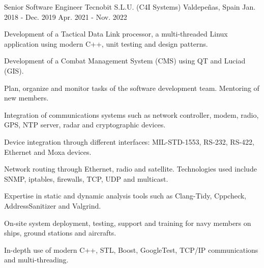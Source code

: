 

\begin{cventries}

  \cventry
    {Senior Software Engineer} %
    {Tecnobit S.L.U. (C4I Systems)} %
    {Valdepeñas, Spain} %
    {Jan. 2018 - Dec. 2019  \newline   Apr. 2021 - Nov. 2022} %
    {
      \begin{cvitems} %
        \item {Development of a Tactical Data Link processor, a multi-threaded Linux application using modern C++, unit testing and design patterns.}
        \item {Development of a Combat Management System (CMS) using QT and Luciad (GIS).}
        \item {Plan, organize and monitor tasks of the software development team. Mentoring of new members.}
        \item {Integration of communications systems such as network controller, modem, radio, GPS, NTP server, radar and cryptographic devices.}
        \item {Device integration through different interfaces: MIL-STD-1553, RS-232, RS-422, Ethernet and Moxa devices.}
        \item {Network routing through Ethernet, radio and satellite. Technologies used include SNMP, iptables, firewalls, TCP, UDP and multicast.}
        \item {Expertise in static and dynamic analysis tools such as Clang-Tidy, Cppcheck, AddressSanitizer and Valgrind. }
        \item {On-site system deployment, testing, support and training for navy members on ships, ground stations and aircrafts.}
        \item {In-depth use of modern C++, STL, Boost, GoogleTest, TCP/IP communications and multi-threading.}
      \end{cvitems}
    }


\end{cventries}
